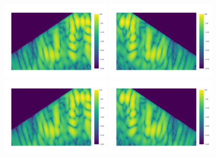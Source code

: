 \newpage
\begin{figure}[H]
    \centering
    \vspace{-1.5em} %
    \includegraphics[page=2, trim=0mm 10mm 0mm 0mm, clip, width=0.49\textwidth]{figures/multipath_nlos_wavefront1.pdf}
    \includegraphics[page=2, trim=0mm 10mm 0mm 0mm, clip, width=0.49\textwidth]{figures/multipath_nlos_wavefront2.pdf}
    \vspace{-1em} %
    \includegraphics[page=1, width=0.49\textwidth]{figures/multipath_nlos_wavefront1.pdf}
    \includegraphics[page=1, width=0.49\textwidth]{figures/multipath_nlos_wavefront2.pdf}

\end{figure}

